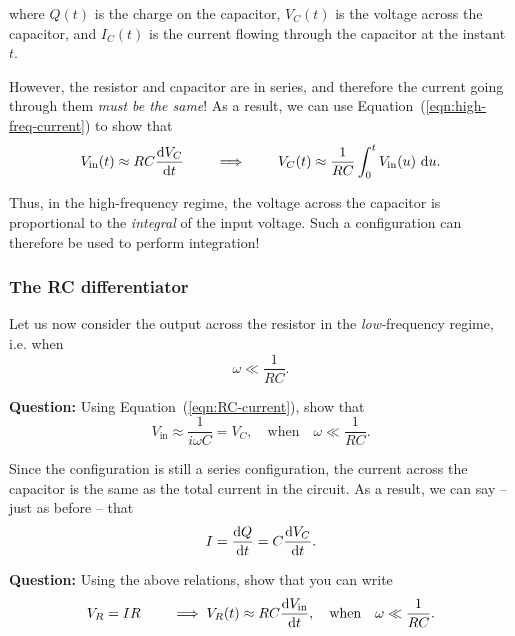 where $Q(t)$ is the charge on the capacitor, $V_C(t)$ is the voltage across the capacitor, and $I_C(t)$ is the  current flowing through the capacitor at the instant $t$.

However, the resistor and capacitor are in series, and therefore the current going through them \textsl{must be the same}! As a result, we can use Equation~(\ref{eqn:high-freq-current}) to show that
\begin{equation}
    V_\text{in} (t) \approx RC \dv{V_C}{t} \quad \quad \implies \quad \quad V_C(t) \approx \frac{1}{RC} \int_0^t V_\text{in}(u)\,\,\dd u.
\end{equation}

Thus, in the high-frequency regime, the voltage across the capacitor is proportional to the \textsl{integral} of the input voltage. Such a configuration can therefore be used to perform integration!

\subsubsection*{The RC differentiator}

Let us now consider the output across the resistor in the \textsl{low-}frequency regime, i.e. when
\begin{equation}
    \omega \ll \frac{1}{RC}.
\end{equation}
\begin{question}
    \textbf{Question:} Using Equation~(\ref{eqn:RC-current}), show that
    \begin{equation}
        V_\text{in} \approx \frac{1}{i \omega C} = V_C, \quad \text{when} \quad \omega \ll \frac{1}{RC}.
    \end{equation}
\end{question}

Since the configuration is still a series configuration, the current across the capacitor is the same as the total current in the circuit. As a result, we can say -- just as before -- that 
\begin{equation}
    I= \dv{Q}{t} = C \dv{V_C}{t}.
\end{equation}
\begin{question}
    \textbf{Question:} Using the above relations, show that you can write 
    \begin{equation}
        V_R = IR \quad \quad \implies V_R(t) \approx RC \dv{V_\text{in}}{t}, \quad \text{when} \quad \omega \ll \frac{1}{RC}.
    \end{equation}
\end{question}

